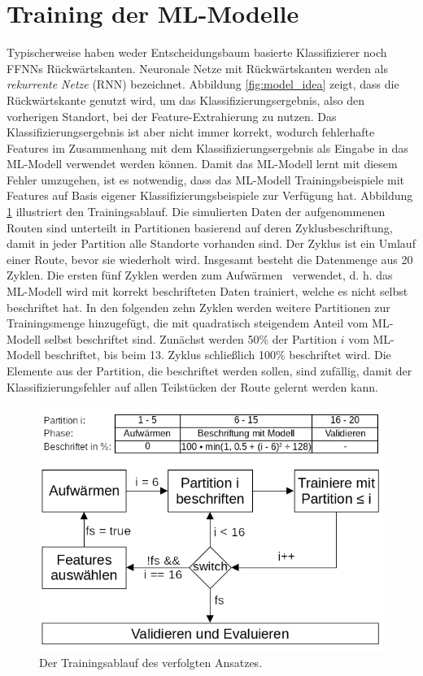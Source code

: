 \section{Training der ML-Modelle}
\label{sec:model_training}
Typischerweise haben weder Entscheidungsbaum basierte Klassifizierer noch FFNNs Rückwärtskanten.
Neuronale Netze mit Rückwärtskanten werden als \textit{rekurrente Netze} (RNN) bezeichnet.
Abbildung \ref{fig:model_idea} zeigt, dass die Rückwärtskante genutzt wird, um das Klassifizierungsergebnis,
also den vorherigen Standort, bei der Feature-Extrahierung zu nutzen.
Das Klassifizierungsergebnis ist aber nicht immer korrekt, wodurch fehlerhafte Features im Zusammenhang
mit dem Klassifizierungsergebnis als Eingabe in das ML-Modell verwendet werden können.
Damit das ML-Modell lernt mit diesem Fehler umzugehen, ist es notwendig, dass das ML-Modell Trainingsbeispiele mit
Features auf Basis eigener Klassifizierungsbeispiele zur Verfügung hat.
\newline
\newline
Abbildung \ref{fig:training_explained} illustriert den Trainingsablauf.
Die simulierten Daten der aufgenommenen Routen sind unterteilt in Partitionen basierend auf deren Zyklusbeschriftung,
damit in jeder Partition alle Standorte vorhanden sind.
Der Zyklus ist ein Umlauf einer Route, bevor sie wiederholt wird.
Insgesamt besteht die Datenmenge aus 20 Zyklen.
Die ersten fünf Zyklen werden zum \glqq Aufwärmen \grqq\ verwendet,
d. h. das ML-Modell wird mit korrekt beschrifteten Daten trainiert, welche es nicht selbst beschriftet hat.
In den folgenden zehn Zyklen werden weitere Partitionen zur Trainingsmenge hinzugefügt, die mit quadratisch steigendem Anteil vom ML-Modell selbst beschriftet sind.
Zunächst werden 50\% der Partition $i$ vom ML-Modell beschriftet, bis beim 13. Zyklus schließlich 100\% beschriftet wird.
Die Elemente aus der Partition, die beschriftet werden sollen, sind zufällig, damit der Klassifizierungsfehler auf allen Teilstücken der Route gelernt werden kann.
\begin{figure}[h!]
    \centering
    \includegraphics[width=\linewidth]{images/training_explained.png}
    \caption{Der Trainingsablauf des verfolgten Ansatzes.}
    \label{fig:training_explained}
\end{figure}
